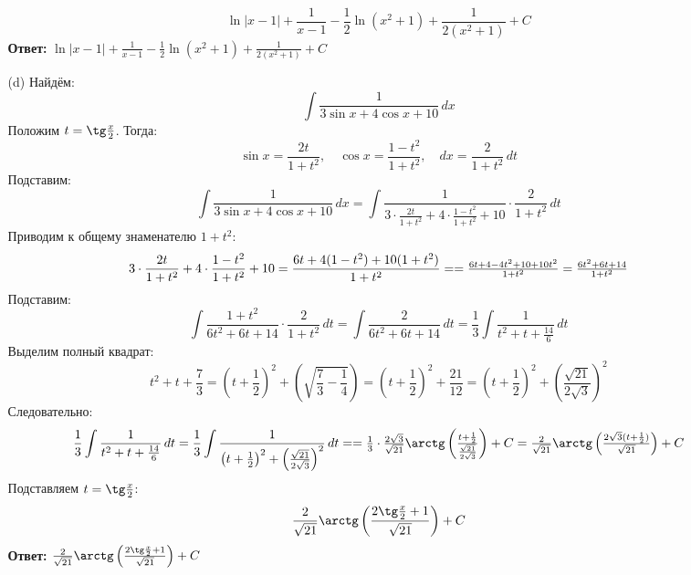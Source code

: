 \documentclass[a4paper]{article}
\begin{document}
\begin{enumerate}
\begin{enumerate}
    \[
    \ln|x - 1| + \frac{1}{x - 1} - \frac{1}{2} \ln(x^2 + 1) + \frac{1}{2(x^2 + 1)} + C
    \]  
    \textbf{Ответ:} $\ln|x - 1| + \frac{1}{x - 1} - \frac{1}{2} \ln(x^2 + 1) + \frac{1}{2(x^2 + 1)} + C$\\

    \item[(d)]Найдём:
    $$\int \frac{1}{3\sin x + 4\cos x + 10} \, dx$$
    Положим \( t = \tg\frac{x}{2} \). Тогда:  
    \[
    \sin x = \frac{2t}{1 + t^2}, \quad \cos x = \frac{1 - t^2}{1 + t^2}, \quad dx = \frac{2}{1 + t^2} \, dt
    \]
    Подставим:
    \[
        \int \frac{1}{3\sin x + 4\cos x + 10} \, dx = \int \frac{1}{3 \cdot \frac{2t}{1 + t^2} + 4 \cdot \frac{1 - t^2}{1 + t^2} + 10} \cdot \frac{2}{1 + t^2} \, dt
    \]
    Приводим к общему знаменателю \( 1 + t^2 \):  
    \[
        3 \cdot \frac{2t}{1 + t^2} + 4 \cdot \frac{1 - t^2}{1 + t^2} + 10 = \frac{6t + 4(1 - t^2) + 10(1 + t^2)}{1 + t^2} =$$
        $$= \frac{6t + 4 - 4t^2 + 10 + 10t^2}{1 + t^2} = \frac{6t^2 + 6t + 14}{1 + t^2}
    \]
    Подставим:
    \[
    \int \frac{1 + t^2}{6t^2 + 6t + 14} \cdot \frac{2}{1 + t^2} \, dt = \int \frac{2}{6t^2 + 6t + 14} \, dt = \frac{1}{3} \int \frac{1}{t^2 + t + \frac{14}{6}} \, dt
    \]
    Выделим полный квадрат:
    \[
    t^2 + t + \frac{7}{3} = \left(t + \frac{1}{2}\right)^2 + \left(\sqrt{\frac{7}{3} - \frac{1}{4}}\right) = \left(t + \frac{1}{2}\right)^2 + \frac{21}{12} = \left(t + \frac{1}{2}\right)^2 + \left(\frac{\sqrt{21}}{2\sqrt{3}}\right)^2
    \]
    Следовательно:
    \[
        \frac{1}{3} \int \frac{1}{t^2 + t + \frac{14}{6}} \, dt = \frac{1}{3} \int \frac{1}{\left(t + \frac{1}{2}\right)^2 + \left(\frac{\sqrt{21}}{2\sqrt{3}}\right)^2} \, dt = $$
        $$=\frac{1}{3} \cdot \frac{2\sqrt{3}}{\sqrt{21}} \arctg\left( \frac{t + \frac{1}{2}}{\frac{\sqrt{21}}{2\sqrt{3}}} \right) + C = \frac{2}{\sqrt{21}} \arctg\left( \frac{2\sqrt{3}(t + \frac{1}{2})}{\sqrt{21}} \right) + C
    \]
    Подставляем \( t = \tg\frac{x}{2} \):  
    \[
    \frac{2}{\sqrt{21}} \arctg\left( \frac{2\tg\frac{x}{2} + 1}{\sqrt{21}} \right) + C
    \]
    \textbf{Ответ:} $\frac{2}{\sqrt{21}} \arctg\left( \frac{2\tg\frac{x}{2} + 1}{\sqrt{21}} \right) + C$\\


\end{enumerate}
\end{enumerate}
\end{document}
